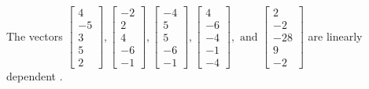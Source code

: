 \begin{exercise}
\begin{exerciseStatement}
  \end{exerciseStatement}
  \begin{exerciseAnswer}
   The vectors \(\left[\begin{array}{r}
4 \\
-5 \\
3 \\
5 \\
2
\end{array}\right] , \left[\begin{array}{r}
-2 \\
2 \\
4 \\
-6 \\
-1
\end{array}\right] , \left[\begin{array}{r}
-4 \\
5 \\
5 \\
-6 \\
-1
\end{array}\right] , \left[\begin{array}{r}
4 \\
-6 \\
-4 \\
-1 \\
-4
\end{array}\right] , \text{ and } \left[\begin{array}{r}
2 \\
-2 \\
-28 \\
9 \\
-2
\end{array}\right]\) are 
  	 linearly dependent  .
  


  \end{exerciseAnswer}
\end{exercise}